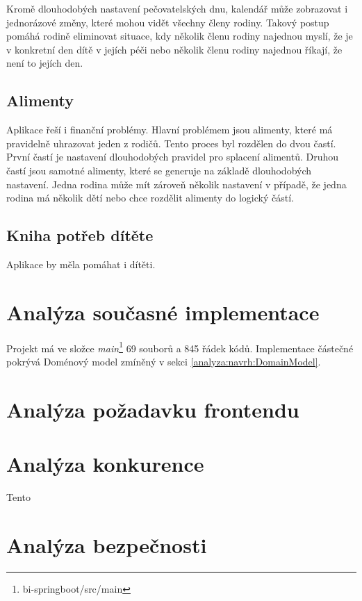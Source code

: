         Kromě dlouhodobých nastavení pečovatelských dnu, kalendář může zobrazovat i jednorázové změny, které mohou vidět všechny členy rodiny. Takový postup pomáhá rodině eliminovat situace, kdy několik členu rodiny najednou myslí, že je v konkretní den dítě v jejích péči nebo několik členu rodiny najednou říkají, že není to jejích den.  
        
    \subsection{Alimenty}    
        Aplikace řeší i finanční problémy. Hlavní problémem jsou alimenty, které má pravidelně uhrazovat jeden z rodičů. Tento proces byl rozdělen do dvou častí. První častí je nastavení dlouhodobých pravidel pro splacení alimentů. Druhou častí jsou samotné alimenty, které se generuje na základě dlouhodobých nastavení. Jedna rodina může mít zároveň několik nastavení v případě, že jedna rodina má několik dětí nebo chce rozdělit alimenty do logický částí.
    
    \subsection{Kniha potřeb dítěte}
        Aplikace by měla pomáhat i dítěti.    
        
   
    
    \section{Analýza současné implementace}\label{analyza:soucasnaImplementace}
        Projekt má ve složce \textit{main}\footnote{bi-springboot/src/main} 69 souborů a 845 řádek kódů. Implementace částečné pokrývá Doménový model zmíněný v sekci \ref{analyza:navrh:DomainModel}. 
    
    \section{Analýza požadavku frontendu}
    
    \section{Analýza konkurence}
        Tento 

    \section{Analýza bezpečnosti}
    
